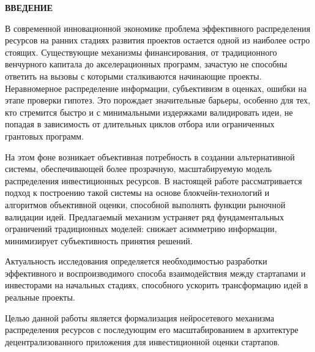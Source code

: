 \documentclass[
    14pt,
    specialist,
    candidate, %
    subf, %
    href,
    dotsinheaders=false
]{disser}
\newcommand{\myunnumberedchapter}[1]{%
  \newpage
  \hypertarget{chap:#1}{}%
  \begin{center}
    \textbf{\MakeUppercase{#1}}
  \end{center}
  \addcontentsline{toc}{chapter}{\texorpdfstring{#1}{#1}}%
}
\begin{document}
\sloppy



\renewcommand{\contentsname}{\centerline{\normalsize\bfseries\centerline{\textbf{\MakeUppercase{СОДЕРЖАНИЕ}}}}}
\setcounter{tocdepth}{1}

\tableofcontents

\myunnumberedchapter{ВВЕДЕНИЕ}

В современной инновационной экономике проблема эффективного распределения ресурсов на ранних стадиях развития проектов остается одной из наиболее остро стоящих. Существующие механизмы финансирования, от традиционного венчурного капитала до акселерационных программ, зачастую не способны ответить на вызовы с которыми сталкиваются начинающие проекты. Неравномерное распределение информации, субъективизм в оценках, ошибки на этапе проверки гипотез. Это порождает значительные барьеры, особенно для тех, кто стремится быстро и с минимальными издержками валидировать идеи, не попадая в зависимость от длительных циклов отбора или ограниченных грантовых программ.

На этом фоне возникает объективная потребность в создании альтернативной системы, обеспечивающей более прозрачную, масштабируемую модель распределения инвестиционных ресурсов. В настоящей работе рассматривается подход к построению такой системы на основе блокчейн-технологий и алгоритмов объективной оценки, способной выполнять функции рыночной валидации идей. Предлагаемый механизм устраняет ряд фундаментальных ограничений традиционных моделей: снижает асимметрию информации, минимизирует субъективность принятия решений.

Актуальность исследования определяется необходимостью разработки эффективного и воспроизводимого способа взаимодействия между стартапами и инвесторами на начальных стадиях, способного ускорить трансформацию идей в реальные проекты.

Целью данной работы является формализация нейросетевого механизма распределения ресурсов с последующим его масштабированием в архитектуре децентрализованного приложения для инвестиционной оценки стартапов.
\end{document}

